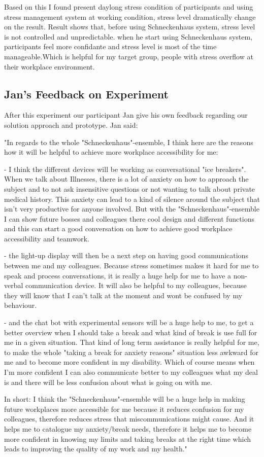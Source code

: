 Based on this I found present daylong stress condition of participants and using stress management system at working condition, stress level dramatically change on the result. Result shows that, before using Schneckenhaus system, stress level is not controlled and unpredictable. when he start using Schneckenhaus system, participants feel more confidante and stress level is most of the time manageable.Which is helpful for my target group, people with stress overflow at their workplace environment. 

\subsection{Jan's Feedback on Experiment}
After this experiment our participant Jan give his own feedback regarding our solution approach and prototype. Jan said:

"In regards to the whole "Schneckenhaus"-ensemble, I think here are the reasons how it will be helpful to achieve more workplace accessibility for me:

- I think the different devices will be working as conversational "ice breakers". When we talk about Illnesses, there is a lot of anxiety on how to approach the subject and to not ask insensitive questions or not wanting to talk about private medical history. This anxiety can lead to a kind of silence around the subject that isn't very productive for anyone involved. But with the "Schneckenhaus"-ensemble I can show future bosses and colleagues there cool design and different functions and this can start a good conversation on how to achieve good workplace accessibility and teamwork.

- the light-up display will then be a next step on having good communications between me and my colleagues. Because stress sometimes makes it hard for me to speak and process conversations, it is really a huge help for me to have a non-verbal communication device. It will also be helpful to my colleagues, because they will know that I can't talk at the moment and wont be confused by my behaviour.

- and the chat bot with experimental sensors will be a huge help to me, to get a better overview when I should take a break and what kind of break is use full for me in a given situation. That kind of long term assistance is really helpful for me, to make the whole "taking a break for anxiety reasons" situation less awkward for me and to become more confident in my disability. Which of course means when I'm more confident I can also communicate better to my colleagues what my deal is and there will be less confusion about what is going on with me.

In short: I think the "Schneckenhaus"-ensemble will be a huge help in making future workplaces more accessible for me because it reduces confusion for my colleagues, therefore reduces stress that miscommunications might cause. And it helps me to catalogue my anxiety/break needs, therefore it helps me to become more confident in knowing my limits and taking breaks at the right time which leads to improving the quality of my work and my health."



